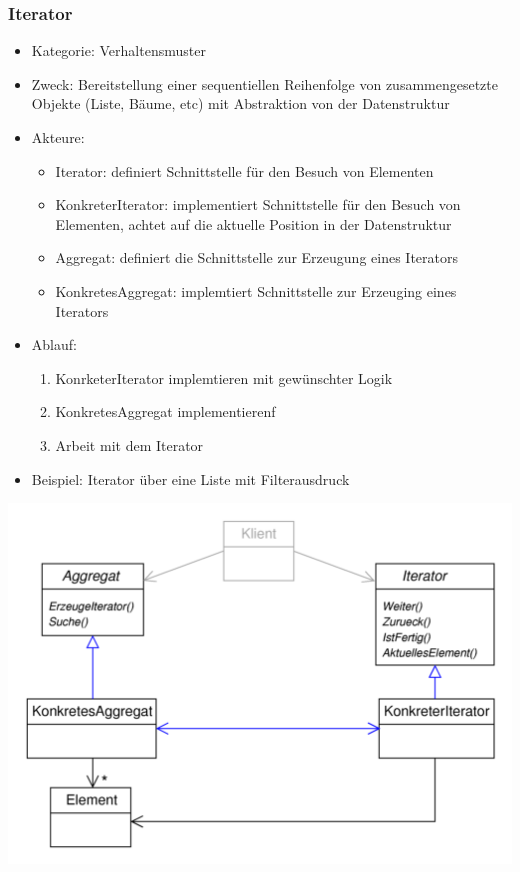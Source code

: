 \documentclass[11pt, fleqn, a4paper, leqno]{scrartcl} %
\begin{document}
		\subsubsection{Iterator}
			\begin{itemize}
				\item Kategorie: Verhaltensmuster
				\item Zweck: Bereitstellung einer sequentiellen Reihenfolge von zusammengesetzte Objekte (Liste, Bäume, etc) mit Abstraktion von der Datenstruktur
				\item Akteure: 
					\begin{itemize}
						\item Iterator: definiert Schnittstelle für den Besuch von Elementen
						\item KonkreterIterator: implementiert Schnittstelle für den Besuch von Elementen, achtet auf die aktuelle Position in der Datenstruktur
						\item Aggregat: definiert die Schnittstelle zur Erzeugung eines Iterators
						\item KonkretesAggregat: implemtiert Schnittstelle zur Erzeuging eines Iterators
					\end{itemize}
				\item Ablauf:
					\begin{enumerate}
						\item KonrketerIterator implemtieren mit gewünschter Logik
						\item KonkretesAggregat implementierenf
						\item Arbeit mit dem Iterator
					\end{enumerate}
				\item Beispiel: Iterator über eine Liste mit Filterausdruck
			\end{itemize}
			\includegraphics[scale=0.8]{images/iterator.png}
			\newpage
\end{document}
